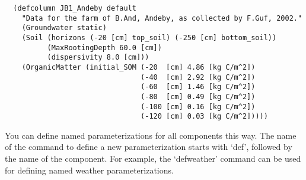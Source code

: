 \begin{verbatim}
  (defcolumn JB1_Andeby default
    "Data for the farm of B.And, Andeby, as collected by F.Guf, 2002."
    (Groundwater static)
    (Soil (horizons (-20 [cm] top_soil) (-250 [cm] bottom_soil))
          (MaxRootingDepth 60.0 [cm])
          (dispersivity 8.0 [cm]))
    (OrganicMatter (initial_SOM (-20  [cm] 4.86 [kg C/m^2])
                                (-40  [cm] 2.92 [kg C/m^2])
                                (-60  [cm] 1.46 [kg C/m^2])
                                (-80  [cm] 0.49 [kg C/m^2])
                                (-100 [cm] 0.16 [kg C/m^2])
                                (-120 [cm] 0.03 [kg C/m^2]))))
\end{verbatim}

You can define named parameterizations for all components this way.
The name of the command to define a new parameterization starts with
`def', followed by the name of the component.  For example, the
`defweather' command can be used for defining named weather
parameterizations.

